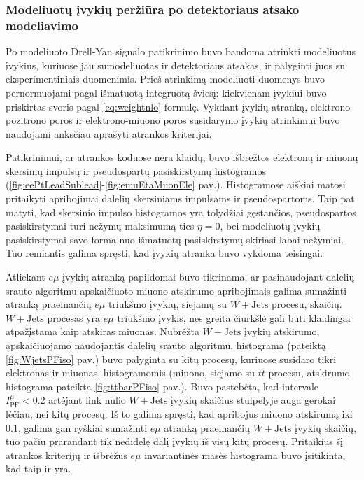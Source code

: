 \documentclass[a4paper, 12pt]{article}
\newcommand{\WJets}{W\! +\!\mathrm{Jets}}
\newlength\q
\begin{document}
\vspace{-0.8cm}
\subsubsection{Modeliuotų įvykių peržiūra po detektoriaus atsako modeliavimo}
\vspace{-0.15cm}
Po modeliuoto Drell-Yan signalo patikrinimo buvo bandoma atrinkti modeliuotus įvykius, kuriuose jau sumodeliuotas ir detektoriaus atsakas, ir palyginti juos su eksperimentiniais duomenimis. Prieš atrinkimą modeliuoti duomenys buvo pernormuojami pagal išmatuotą integruotą šviesį: kiekvienam įvykiui buvo priskirtas svoris pagal \eqref{eq:weightnlo} formulę. Vykdant įvykių atranką, elektrono-pozitrono poros ir elektrono-miuono poros susidarymo įvykių atrinkimui buvo naudojami anksčiau aprašyti atrankos kriterijai.

Patikrinimui, ar atrankos koduose nėra klaidų, buvo išbrėžtos elektronų ir miuonų skersinių impulsų ir pseudospartų pasiskirstymų histogramos (\ref{fig:eePtLeadSublead}-\ref{fig:emuEtaMuonEle} pav.). Histogramose aiškiai matosi pritaikyti apribojimai dalelių skersiniams impulsams ir pseudospartoms. Taip pat matyti, kad skersinio impulso histogramos yra tolydžiai gęstančios, pseudospartos pasiskirstymai turi nežymų maksimumą ties $\eta=0$, bei modeliuotų įvykių pasiskirstymai savo forma nuo išmatuotų pasiskirstymų skiriasi labai nežymiai. Tuo remiantis galima spręsti, kad įvykių atranka buvo vykdoma teisingai.

Atliekant $e\mu$ įvykių atranką papildomai buvo tikrinama, ar pasinaudojant dalelių srauto algoritmu apskaičiuoto miuono atskirumo apribojimais galima sumažinti atranką praeinančių $e\mu$ triukšmo įvykių, siejamų su $\WJets$ procesu, skaičių. $\WJets$ procesas yra $e\mu$ triukšmo įvykis, nes greita čiurkšlė gali būti klaidingai atpažįstama kaip atskiras miuonas. Nubrėžta $\WJets$ įvykių atskirumo, apskaičiuojamo naudojantis dalelių srauto algoritmu, histograma (pateiktą \ref{fig:WjetsPFiso} pav.) buvo palyginta su kitų procesų, kuriuose susidaro tikri elektronas ir miuonas, histogramomis (miuono, siejamo su $t\bar{t}$ procesu, atskirumo histograma pateikta \ref{fig:ttbarPFiso} pav.). Buvo pastebėta, kad intervale $I_{\mathrm{PF}}^{\mu}<0.2$ artėjant link nulio $\WJets$ įvykių skaičius stulpelyje auga gerokai lėčiau, nei kitų procesų. Iš to galima spręsti, kad apribojus miuono atskirumą iki $0.1$, galima gan ryškiai sumažinti $e\mu$ atranką praeinančių $\WJets$ įvykių skaičių, tuo pačiu prarandant tik nedidelę dalį įvykių iš visų kitų procesų. Pritaikius šį atrankos kriterijų ir išbrėžus $e\mu$ invariantinės masės histograma buvo įsitikinta, kad taip ir yra.
\end{document}
